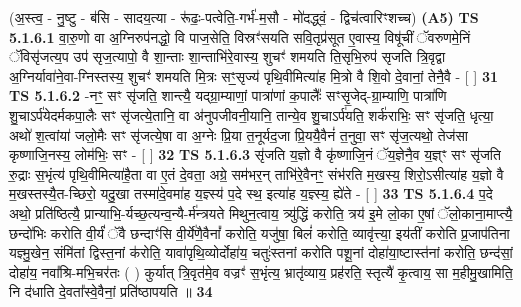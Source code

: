 \documentclass[17pt]{extarticle}
\begin{document}
                  \newline
                      (अ॒स्त्व॒ - नु॒ष्टु - ब॑सि - सादय॒त्या - रू॑ढः॒-पत्वेति॒-गर्भ॑-म॒सौ - मो॑दद्ध्वं॒ - द्विच॑त्वारिꣳशच्च)  \textbf{(A5)} \newline \newline
                                        \textbf{ TS 5.1.6.1} \newline
                  वा॒रु॒णो वा अ॒ग्निरुप॑नद्धो॒ वि पाज॒सेति॒ विस्रꣳ॑सयति सवि॒तृप्र॑सूत ए॒वास्य॒ विषू॑चीं ॅवरुणमे॒निं ॅविसृ॑जत्य॒प उप॑ सृज॒त्यापो॒ वै शा॒न्ताः शा॒न्ताभि॑रे॒वास्य॒ शुचꣳ॑ शमयति ति॒सृभि॒रुप॑ सृजति त्रि॒वृद्वा अ॒ग्निर्यावा॑ने॒वा-ग्निस्तस्य॒ शुचꣳ॑ शमयति मि॒त्रः सꣳ॒॒सृज्य॑ पृथि॒वीमित्या॑ह मि॒त्रो वै शि॒वो दे॒वानां॒ तेनै॒वै - [  ] \textbf{  31} \newline
                  \newline
                                \textbf{ TS 5.1.6.2} \newline
                  -नꣳ॒॒ सꣳ सृ॑जति॒ शान्त्यै॒ यद्ग्रा॒म्याणां॒ पात्रा॑णां क॒पालैः᳚ सꣳसृ॒जेद्-ग्रा॒म्याणि॒ पात्रा॑णि शु॒चाऽर्प॑येदर्मकपा॒लैः सꣳ सृ॑जत्ये॒तानि॒ वा अ॑नुपजीवनी॒यानि॒ तान्ये॒व शु॒चाऽर्प॑यति॒ शर्क॑राभिः॒ सꣳ सृ॑जति॒ धृत्या॒ अथो॑ श॒त्वांया॑ जलो॒मैः सꣳ सृ॑जत्ये॒षा वा अ॒ग्नेः प्रि॒या त॒नूर्यद॒जा प्रि॒ययै॒वैनं॑ त॒नुवा॒ सꣳ सृ॑ज॒त्यथो॒ तेज॑सा कृष्णाजि॒नस्य॒ लोम॑भिः॒ सꣳ - [  ] \textbf{  32} \newline
                  \newline
                                \textbf{ TS 5.1.6.3} \newline
                  सृ॑जति य॒ज्ञो वै कृ॑ष्णाजि॒नं ॅय॒ज्ञेनै॒व य॒ज्ञ्ꣳ सꣳ सृ॑जति रु॒द्राः स॒भृंत्य॑ पृथि॒वीमित्या॑है॒ता वा ए॒तं दे॒वता॒ अग्रे॒ सम॑भर॒न् ताभि॑रे॒वैनꣳ॒॒ संभ॑रति म॒खस्य॒ शिरो॒ऽसीत्या॑ह य॒ज्ञो वै म॒खस्तस्यै॒त-च्छिरो॒ यदु॒खा तस्मा॑दे॒वमा॑ह य॒ज्ञ्स्य॑ प॒दे स्थ॒ इत्या॑ह य॒ज्ञ्स्य॒ ह्ये॑ते - [  ] \textbf{  33} \newline
                  \newline
                                \textbf{ TS 5.1.6.4} \newline
                  प॒दे अथो॒ प्रति॑ष्ठित्यै॒ प्रान्याभि॒-र्यच्छ॒त्यन्व॒न्यै-र्म॑न्त्रयते मिथुन॒त्वाय॒ त्र्यु॑द्धिं करोति॒ त्रय॑ इ॒मे लो॒का ए॒षां ॅलो॒काना॒माप्त्यै॒ छन्दो॑भिः करोति वी॒र्यं॑ ॅवै छन्दाꣳ॑सि वी॒र्ये॑णै॒वैनां᳚ करोति॒ यजु॑षा॒ बिलं॑ करोति॒ व्यावृ॑त्त्या॒ इय॑तीं करोति प्र॒जाप॑तिना यज्ञ्मु॒खेन॒ संमि॑तां द्विस्त॒नां क॑रोति॒ यावा॑पृथि॒व्योर्दोहा॑य॒ चतुः॑स्तनां करोति पशू॒नां दोहा॑या॒ष्टास्त॑नां करोति॒ छन्द॑सां॒ दोहा॑य॒ नवा᳚श्रि-मभि॒चर॑तः ( ) कुर्यात् त्रि॒वृत॑मे॒व वज्रꣳ॑ स॒भृंत्य॒ भ्रातृ॑व्याय॒ प्रह॑रति॒ स्तृत्यै॑ कृ॒त्वाय॒ सा म॒हीमु॒खामिति॒ नि द॑धाति दे॒वता᳚स्वे॒वैनां॒ प्रति॑ष्ठापयति ॥ \textbf{  34} \newline
\end{document}
